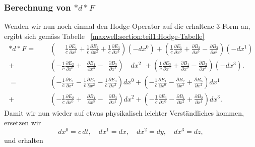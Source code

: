 \subsubsection{Berechnung von $\ast d {\ast} F$}
Wenden wir nun noch einmal den Hodge-Operator auf die erhaltene 3-Form an, ergibt sich gemäss Tabelle ~\ref{maxwell:section:teil1:Hodge-Tabelle}
\begin{align*}
	\ast d {\ast} F 
	= 
	\phantom{+} &\left(\phantom{+} \frac{1}{c}\frac{\partial E_1}{\partial x^1} + \frac{1}{c}\frac{\partial E_2}{\partial x^2} + \frac{1}{c}\frac{\partial E_3}{\partial x^3} \right) (-dx^0) +
	\left(\frac{1}{c}\frac{\partial E_1}{\partial x^0} + \frac{\partial B_2}{\partial x^3} - \frac{\partial B_3}{\partial x^2} \right) (-dx^1)
	\\
	+ &\left( -\frac{1}{c}\frac{\partial E_2}{\partial x^0} + \phantom{\frac{1}{c}} \frac{\partial B_1}{\partial x^3} - \phantom{\frac{1}{c}} \frac{\partial B_3}{\partial x^1} \right) \quad dx^2 \: \, +
	\left( \frac{1}{c}\frac{\partial E_3}{\partial x^0} + \frac{\partial B_1}{\partial x^2} - \frac{\partial B_2}{\partial x^1} \right) (-dx^3).\\[2ex]
	=
	\phantom{+} &\left( -\frac{1}{c}\frac{\partial E_1}{\partial x^1} -\frac{1}{c}\frac{\partial E_2}{\partial x^2} - \frac{1}{c}\frac{\partial E_3}{\partial x^3} \right) dx^0 +
	\left(-\frac{1}{c}\frac{\partial E_1}{\partial x^0} - \frac{\partial B_2}{\partial x^3} + \frac{\partial B_3}{\partial x^2} \right) dx^1
	\\
	+ &\left( -\frac{1}{c}\frac{\partial E_2}{\partial x^0} + \phantom{\frac{1}{c}} \frac{\partial B_1}{\partial x^3} - \phantom{\frac{1}{c}} \frac{\partial B_3}{\partial x^1} \right) dx^2 +
	\left( -\frac{1}{c}\frac{\partial E_3}{\partial x^0} - \frac{\partial B_1}{\partial x^2} + \frac{\partial B_2}{\partial x^1} \right) dx^3.
\end{align*}
Damit wir nun wieder auf etwas physikalisch leichter Verständliches kommen, ersetzen wir
\begin{equation}
	dx^0 = c\,dt, \quad dx^1 = dx, \quad dx^2 = dy, \quad dx^3 = dz,
\end{equation}
und erhalten

